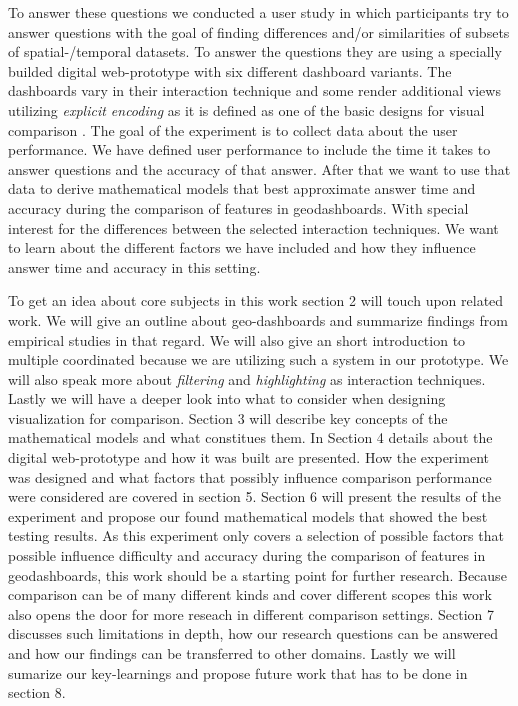To answer these questions we conducted a user study in which participants try to answer
questions with the goal of finding differences and/or similarities of subsets
of spatial-/temporal datasets. To answer the
questions they are using a specially builded digital web-prototype with six different dashboard
variants. The dashboards vary in their interaction technique and some render additional views
utilizing \textit{explicit encoding} as it is defined as one of the basic designs for visual
comparison \citep*{Gleicher.2018}. The goal of the experiment is to collect data about the user
performance. We have defined user performance to include the time it takes to answer questions
and the accuracy of that answer. After that we want to use that data to derive mathematical
models that best approximate answer time and accuracy during the comparison of features in
geodashboards. With special interest for the differences between the selected interaction
techniques. We want to learn about the different factors we have included and how they
influence answer time and accuracy in this setting.

To get an idea about core subjects in this work section 2 will touch upon related work. We
will give an outline about geo-dashboards and summarize findings from empirical studies in that
regard. We will also give an short introduction to multiple coordinated because we are utilizing
such a system in our prototype. We will also speak more about \textit{filtering} and
\textit{highlighting} as interaction techniques. Lastly we will have a deeper look into what to
consider when designing visualization for comparison.
Section 3 will describe key concepts of the mathematical models and what constitues them.
In Section 4 details about the digital web-prototype and how it was built are presented. How the
experiment was designed and what factors that possibly influence comparison performance were considered
are covered in section 5. Section 6 will present the results of the experiment and propose our found
mathematical models that showed the best testing results.
As this experiment only covers a selection of possible factors that possible influence difficulty and
accuracy during the comparison of features in geodashboards, this work should be a starting point for
further research. Because comparison can be of many different kinds and cover different scopes this work
also opens the door for more reseach in different comparison settings. Section 7 discusses such limitations
in depth, how our research questions can be answered and how our findings can be transferred to other domains.
Lastly we will sumarize our key-learnings and propose future work that has to be done in section 8.